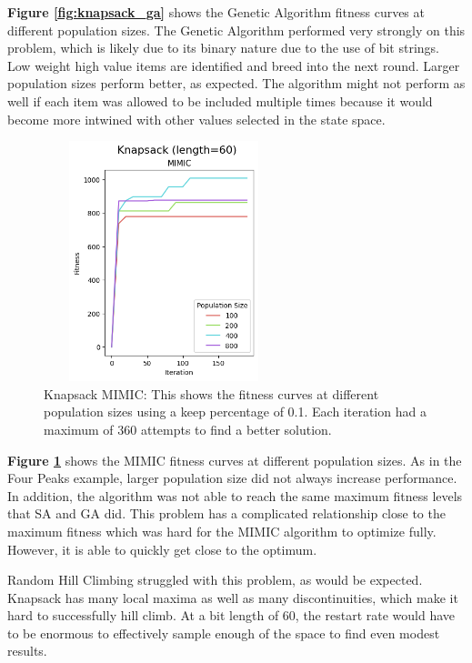 \documentclass[letterpaper]{article} %
\begin{document}
\textbf{Figure \ref{fig:knapsack_ga}} shows the Genetic Algorithm fitness curves at different population sizes.  The Genetic Algorithm performed very strongly on this problem, which is likely due to its binary nature due to the use of bit strings.  Low weight high value items are identified and breed into the next round.  Larger population sizes perform better, as expected.  The algorithm might not perform as well if each item was allowed to be included multiple times because it would become more intwined with other values selected in the state space.

\begin{figure}[!htb]
\centering
\includegraphics[width=2.75in, height=2.75in]{figures/Knapsack_length=60_MIMIC_l_60_ma_360_p_100__200__400__800_k_0.1_.png}
\caption{Knapsack MIMIC: This shows the fitness curves at different population sizes using a keep percentage of 0.1. Each iteration had a maximum of 360 attempts to find a better solution. }
\label{fig:knapsack_mimic}
\end{figure}

\textbf{Figure \ref{fig:knapsack_mimic}} shows the MIMIC fitness curves at different population sizes.   As in the Four Peaks example,  larger population size did not always increase performance.  In addition, the algorithm was not able to reach the same maximum fitness levels that SA and GA did.  This problem has a complicated relationship close to the maximum fitness which was hard for the MIMIC algorithm to optimize fully.  However, it is able to quickly get close to the optimum.

Random Hill Climbing struggled with this problem, as would be expected.  Knapsack has many local maxima as well as many discontinuities, which make it hard to successfully hill climb.   At a bit length of 60, the restart rate would have to be enormous to effectively sample enough of the space to find even modest results.
\end{document}
